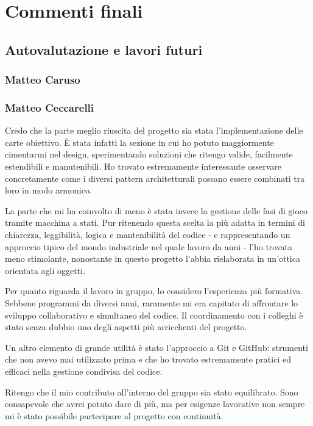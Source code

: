 \documentclass[a4paper,12pt]{report}
\begin{document}
\chapter{Commenti finali}

\section{Autovalutazione e lavori futuri}
\subsection{Matteo Caruso}
\subsection{Matteo Ceccarelli}
Credo che la parte meglio riuscita del progetto sia stata l’implementazione delle carte obiettivo.
È stata infatti la sezione in cui ho potuto maggiormente cimentarmi nel design, sperimentando soluzioni che ritengo valide, facilmente estendibili e manutenibili.
Ho trovato estremamente interessante osservare concretamente come i diversi pattern architetturali possano essere combinati tra loro in modo armonico.

La parte che mi ha coinvolto di meno è stata invece la gestione delle fasi di gioco tramite macchina a stati.
Pur ritenendo questa scelta la più adatta in termini di chiarezza, leggibilità, logica e mantenibilità del codice
- e rappresentando un approccio tipico del mondo industriale nel quale lavoro da anni -
l’ho trovata meno stimolante, nonostante in questo progetto l’abbia rielaborata in un’ottica orientata agli oggetti.

Per quanto riguarda il lavoro in gruppo, lo considero l’esperienza più formativa.
Sebbene programmi da diversi anni, raramente mi era capitato di affrontare lo sviluppo collaborativo e simultaneo del codice.
Il coordinamento con i colleghi è stato senza dubbio uno degli aspetti più arricchenti del progetto.

Un altro elemento di grande utilità è stato l’approccio a Git e GitHub: strumenti che non avevo mai utilizzato prima e che ho trovato estremamente pratici ed efficaci nella gestione condivisa del codice.

Ritengo che il mio contributo all’interno del gruppo sia stato equilibrato. Sono consapevole che avrei potuto dare di più,
ma per esigenze lavorative non sempre mi è stato possibile partecipare al progetto con continuità.
\end{document}
